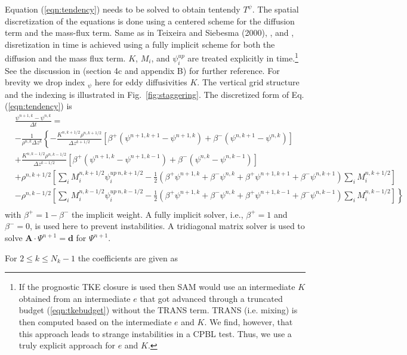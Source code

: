 \documentclass[dvipdfmx,a4paper,10pt]{article}
\begin{document}
Equation (\ref{eqn:tendency}) needs to be solved to obtain tentendy $T^{\psi}$. The spatial discretization of the equations is done using a centered scheme for the diffusion term and the mass-flux term. Same as in Teixeira and Siebesma (2000), \cite{siebesma07}, and \cite{soares04}, disretization in time is achieved using a fully implicit scheme for both the diffusion and the mass flux term. $K$, $M_i$, and $\psi^{up}_i$ are treated explicitly in time.\footnote{If the prognostic TKE closure is used then SAM would use an intermediate $K$ obtained from an intermediate $e$ that got advanced through a truncated budget (\ref{eqn:tkebudget}) without the TRANS term. TRANS (i.e. mixing) is then computed based on the intermediate $e$ and $K$. We find, however, that this approach leads to strange instabilities in a CPBL test. Thus, we use a truly explicit approach for $e$ and $K$.} See the discussion in \cite{siebesma07} (section 4c and appendix B) for further reference. For brevity we drop index $_\psi$ here for eddy diffusivities $K$. The vertical grid structure and the indexing is illustrated in Fig.~\ref{fig:staggering}. The discretized form of Eq. (\ref{eqn:tendency}) is
\begin{align*}
  &\frac{\psi^{n+1,k}- \psi^{n,k} }{\Delta t} =\\
  &-\frac{1}{\rho^{n,k}\Delta z^{k}}\left\{ -\frac{K^{n,k+1/2}\rho^{n,k+1/2} }{\Delta z^{k+1/2}} [\beta^+(\psi^{n+1,k+1}-\psi^{n+1,k}) + \beta^-(\psi^{n,k+1}-\psi^{n,k})] \right. \\
    & \left.+\frac{K^{n,k-1/2}\rho^{n,k-1/2} }{\Delta z^{k-1/2}} [\beta^+(\psi^{n+1,k}-\psi^{n+1,k-1}) + \beta^-(\psi^{n,k}-\psi^{n,k-1})] \right.\\
    & \left. +\rho^{n,k+1/2}\left[\sum_i M_i^{n,k+1/2}\psi_i^{up~n,k+1/2} - \frac{1}{2}(\beta^+\psi^{n+1,k}+\beta^-\psi^{n,k}+\beta^+\psi^{n+1,k+1}+\beta^-\psi^{n,k+1} )\sum_i M_i^{n,k+1/2} \right]\right.\\
    &\left.-\rho^{n,k-1/2}\left[\sum_i M_i^{n,k-1/2}\psi_i^{up~n,k-1/2} - \frac{1}{2}(\beta^+\psi^{n+1,k}+\beta^-\psi^{n,k}+\beta^+\psi^{n+1,k-1}+\beta^-\psi^{n,k-1} )\sum_i M_i^{n,k-1/2} \right] \right\}\\
\end{align*}
with $\beta^+=1-\beta^-$ the implicit weight. A fully implicit solver, i.e., $\beta^{+}=1$ and $\beta^-=0$, is used here to prevent instabilities. A tridiagonal matrix solver is used to solve $\mathbf{A}\cdot\Psi^{n+1}=\mathbf{d}$ for $\Psi^{n+1}$. 

\noindent For $2\leq k \leq N_k-1$ the coefficients are given as 
\end{document}
